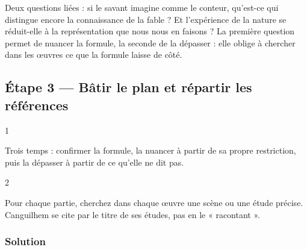 \documentclass[11pt,a4paper]{article}
\begin{document}
Deux questions liées : si le savant imagine comme le conteur, qu'est-ce qui distingue encore la connaissance de la fable ? Et l'expérience de la nature se réduit-elle à la représentation que nous nous en faisons ? La première question permet de nuancer la formule, la seconde de la dépasser : elle oblige à chercher dans les œuvres ce que la formule laisse de côté.

\hypertarget{uxe9tape-3-buxe2tir-le-plan-et-ruxe9partir-les-ruxe9fuxe9rences}{%
\subsection{Étape 3 --- Bâtir le plan et répartir les références}\label{uxe9tape-3-buxe2tir-le-plan-et-ruxe9partir-les-ruxe9fuxe9rences}}

\begin{indication}{1}

Trois temps : confirmer la formule, la nuancer à partir de sa propre restriction, puis la dépasser à partir de ce qu'elle ne dit pas.

\end{indication}

\begin{indication}{2}

Pour chaque partie, cherchez dans chaque œuvre une scène ou une étude précise. Canguilhem se cite par le titre de ses études, pas en le « racontant ».

\end{indication}

\hypertarget{solution-6}{%
\subsubsection{Solution}\label{solution-6}}
\end{document}
